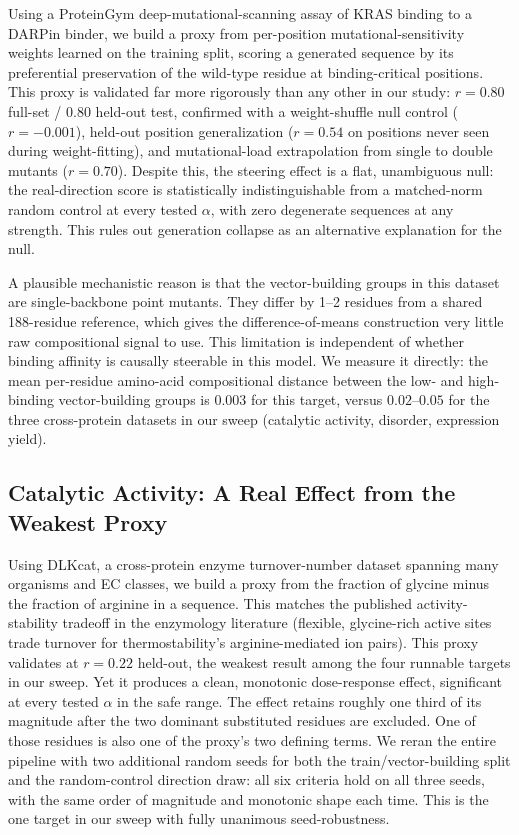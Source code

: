 \documentclass{article}
\begin{document}
Using a ProteinGym deep-mutational-scanning assay of KRAS binding to a
DARPin binder, we build a proxy from per-position mutational-sensitivity
weights learned on the training split, scoring a generated sequence by
its preferential preservation of the wild-type residue at
binding-critical positions. This proxy is validated far more rigorously
than any other in our study: $r=0.80$ full-set / $0.80$ held-out test,
confirmed with a weight-shuffle null control ($r=-0.001$), held-out
position generalization ($r=0.54$ on positions never seen during
weight-fitting), and mutational-load extrapolation from single to double
mutants ($r=0.70$). Despite this, the steering effect is a flat,
unambiguous null: the real-direction score is statistically
indistinguishable from a matched-norm random control at every tested
$\alpha$, with zero degenerate sequences at any strength. This rules out
generation collapse as an alternative explanation for the null.

A plausible mechanistic reason is that the vector-building groups in this
dataset are single-backbone point mutants. They differ by 1--2 residues
from a shared 188-residue reference, which gives the difference-of-means
construction very little raw compositional signal to use. This limitation
is independent of whether binding affinity is causally steerable in this
model. We measure it directly: the mean per-residue
amino-acid compositional distance between the low- and high-binding
vector-building groups is $0.003$ for this target, versus $0.02$--$0.05$
for the three cross-protein datasets in our sweep (catalytic activity,
disorder, expression yield).

\subsection{Catalytic Activity: A Real Effect from the Weakest Proxy}

Using DLKcat, a cross-protein enzyme turnover-number dataset spanning many
organisms and EC classes, we build a proxy from the fraction of glycine
minus the fraction of arginine in a sequence. This matches the published
activity-stability tradeoff in the enzymology
literature (flexible, glycine-rich active sites trade turnover for
thermostability's arginine-mediated ion pairs). This proxy validates at
$r=0.22$ held-out, the weakest result among the four runnable targets in
our sweep. Yet it produces a clean, monotonic dose-response effect,
significant at every tested $\alpha$ in the safe range. The effect
retains roughly one third of its magnitude after the two dominant
substituted residues are excluded. One of those residues is also one of
the proxy's two defining terms. We reran the
entire pipeline with two additional random seeds for both the
train/vector-building split and the random-control direction draw: all
six criteria hold on all three seeds, with the same order of magnitude
and monotonic shape each time. This is the one target in our sweep with
fully unanimous seed-robustness.
\end{document}
